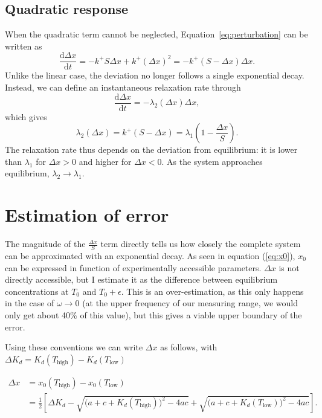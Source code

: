 \documentclass[11pt,a4paper]{article}
\begin{document}
\subsection{Quadratic response}

When the quadratic term cannot be neglected,
Equation~\eqref{eq:perturbation} can be written as
\begin{equation}
    \frac{\mathrm{d}\Delta x}{\mathrm{d}t}
    = -k^+S\Delta x+k^+(\Delta x)^2
    = -k^+(S-\Delta x)\Delta x.
\end{equation}
Unlike the linear case, the deviation no longer follows a single
exponential decay. Instead, we can define an instantaneous
relaxation rate through
\begin{equation}
    \frac{\mathrm{d}\Delta x}{\mathrm{d}t}
    = -\lambda_{\mathrm{2}}(\Delta x)\Delta x,
\end{equation}
which gives
\begin{equation}
    \boxed{\lambda_{\mathrm{2}}(\Delta x)
    = k^+(S-\Delta x)
    = \lambda_1\left(1-\frac{\Delta x}{S}\right).}
\end{equation}
The relaxation rate thus depends on the deviation from equilibrium:
it is lower than $\lambda_1$ for $\Delta x>0$ and higher for
$\Delta x<0$. As the system approaches equilibrium,
$\lambda_{\mathrm{2}}\to\lambda_1$.

\section{Estimation of error}
The  magnitude of the $\frac{\Delta x}{S}$ term directly tells us how closely the complete system can be approximated with an exponential decay. As seen in equation (\ref{eq:x0}), $x_0$ can be expressed in function of experimentally accessible parameters. $\Delta x$ is not directly accessible, but I estimate it as the difference between equilibrium concentrations at $T_0$ and $T_0 + \epsilon$. This is an over-estimation, as this only happens in the case of $\omega \rightarrow 0$ (at the upper frequency of our measuring range, we would only get about 40\% of this value), but this gives a viable upper boundary of the error.

Using these conventions we can write $\Delta x$ as follows, with \(\Delta K_d=K_d(T_{\mathrm{high}})-K_d(T_{\mathrm{low}})\)

\begin{equation}
\begin{aligned}
\Delta x
&= x_0(T_{\mathrm{high}})-x_0(T_{\mathrm{low}})\\
&= \frac{1}{2}\left[
\Delta K_d
-\sqrt{\bigl(a+c+K_d(T_{\mathrm{high}})\bigr)^2-4ac}
+\sqrt{\bigl(a+c+K_d(T_{\mathrm{low}})\bigr)^2-4ac}
\right].
\end{aligned}
\end{equation}
\end{document}
